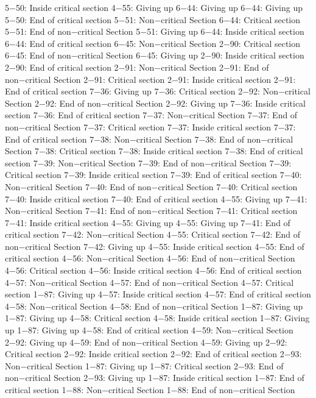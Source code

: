 5−50: Inside critical section
4−55: Giving up
6−44: Giving up
6−44: Giving up
5−50: End of critical section
5−51: Non−critical Section
6−44: Critical section
5−51: End of non−critical Section
5−51: Giving up
6−44: Inside critical section
6−44: End of critical section
6−45: Non−critical Section
2−90: Critical section
6−45: End of non−critical Section
6−45: Giving up
2−90: Inside critical section
2−90: End of critical section
2−91: Non−critical Section
2−91: End of non−critical Section
2−91: Critical section
2−91: Inside critical section
2−91: End of critical section
7−36: Giving up
7−36: Critical section
2−92: Non−critical Section
2−92: End of non−critical Section
2−92: Giving up
7−36: Inside critical section
7−36: End of critical section
7−37: Non−critical Section
7−37: End of non−critical Section
7−37: Critical section
7−37: Inside critical section
7−37: End of critical section
7−38: Non−critical Section
7−38: End of non−critical Section
7−38: Critical section
7−38: Inside critical section
7−38: End of critical section
7−39: Non−critical Section
7−39: End of non−critical Section
7−39: Critical section
7−39: Inside critical section
7−39: End of critical section
7−40: Non−critical Section
7−40: End of non−critical Section
7−40: Critical section
7−40: Inside critical section
7−40: End of critical section
4−55: Giving up
7−41: Non−critical Section
7−41: End of non−critical Section
7−41: Critical section
7−41: Inside critical section
4−55: Giving up
4−55: Giving up
7−41: End of critical section
7−42: Non−critical Section
4−55: Critical section
7−42: End of non−critical Section
7−42: Giving up
4−55: Inside critical section
4−55: End of critical section
4−56: Non−critical Section
4−56: End of non−critical Section
4−56: Critical section
4−56: Inside critical section
4−56: End of critical section
4−57: Non−critical Section
4−57: End of non−critical Section
4−57: Critical section
1−87: Giving up
4−57: Inside critical section
4−57: End of critical section
4−58: Non−critical Section
4−58: End of non−critical Section
1−87: Giving up
1−87: Giving up
4−58: Critical section
4−58: Inside critical section
1−87: Giving up
1−87: Giving up
4−58: End of critical section
4−59: Non−critical Section
2−92: Giving up
4−59: End of non−critical Section
4−59: Giving up
2−92: Critical section
2−92: Inside critical section
2−92: End of critical section
2−93: Non−critical Section
1−87: Giving up
1−87: Critical section
2−93: End of non−critical Section
2−93: Giving up
1−87: Inside critical section
1−87: End of critical section
1−88: Non−critical Section
1−88: End of non−critical Section
